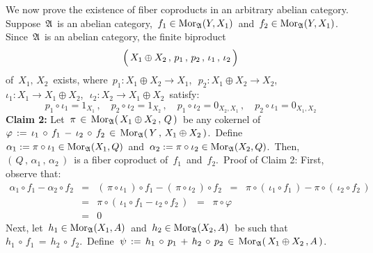 \begin{enumerate}
	We now prove the existence of fiber coproducts in an arbitrary abelian category.
	Suppose \,$\mathfrak{A}$\, is an abelian category,
	\,$f_{1} \in \textnormal{Mor}_{\mathfrak{A}}(Y,X_{1})$\,
	and
	\,$f_{2} \in \textnormal{Mor}_{\mathfrak{A}}(Y,X_{1})$.\,
	Since \,$\mathfrak{A}$\, is an abelian category, the finite {\color{red}biproduct}
	\begin{equation*}
	\left(\,
		X_{1} \overset{{\color{white}.}}{\oplus} X_{2}
		\,,\,
		p_{1}
		\,,\,
		p_{2}
		\,,\,
		\iota_{1}
		\,,\,
		\iota_{2}
		\,\right)
	\end{equation*}
	of \,$X_{1},\, X_{2}$\, exists, where
	\,$p_{1} : X_{1} \oplus X_{2} \longrightarrow X_{1}$,\,
	\,$p_{2} : X_{1} \oplus X_{2} \longrightarrow X_{2}$,\,
	\,$\iota_{1} : X_{1} \longrightarrow X_{1} \oplus X_{2}$,\,
	\,$\iota_{2} : X_{2} \longrightarrow X_{1} \oplus X_{2}$\,
	satisfy:
	\begin{equation*}
	p_{1} \circ \iota_{1} = 1_{X_{1}}\,,
	\quad
	p_{2} \circ \iota_{2} = 1_{X_{2}}\,,
	\quad
	p_{1} \circ \iota_{2} = 0_{X_{2},X_{1}}\,,
	\quad
	p_{2} \circ \iota_{1} = 0_{X_{1},X_{2}}
	\end{equation*}
	\vskip 0.3cm
	\noindent
	\textbf{Claim 2:}\quad
	Let \,$\pi \,\in\, \textnormal{Mor}_{\mathfrak{A}}(\,X_{1}\oplus X_{2}\,,\,Q\,)$\,
	be any {\color{red}cokernel of
	\,$\varphi\,:=\,\iota_{1}\,\circ\,f_{1}\,-\,\iota_{2}\,\circ\,f_{2}\,\in\,\textnormal{Mor}_{\mathfrak{A}}(\,Y\,,\,X_{1} \oplus X_{2}\,)$}.\,
	Define
	\,$\alpha_{1} := \pi \circ \iota_{1} \in \textnormal{Mor}_{\mathfrak{A}}(X_{1},Q)$\,
	and
	\,$\alpha_{2} := \pi \circ \iota_{2} \in \textnormal{Mor}_{\mathfrak{A}}(X_{2},Q)$.\,
	Then,
	\,$\left(\,Q\,,\,\alpha_{1}\,,\,\alpha_{2}\,\right)$\,
	is a fiber coproduct of
	\,$f_{1}$\,
	and
	\,$f_{2}$.\,
	\vskip 0.2cm
	\noindent
	Proof of Claim 2:\;\;
	First, observe that:
	\begin{eqnarray*}
	\alpha_{1} \circ f_{1} - \alpha_{2} \circ f_{2}
	& = &
		(\,\pi \circ \iota_{1}\,) \circ f_{1} - (\,\pi \circ \iota_{2}\,) \circ f_{2}
	\;\; = \;\;
		\pi \circ (\,\iota_{1} \circ f_{1}\,) - \pi \circ (\,\iota_{2} \circ f_{2}\,)
	\\
	& = &
		\pi \circ (\,\iota_{1} \circ f_{1} - \iota_{2} \circ f_{2}\,) 
	\;\; = \;\;
		\pi \circ \varphi
	\\
	& = &
		0
	\end{eqnarray*}
	Next, let
	\,$h_{1} \in \textnormal{Mor}_{\mathfrak{A}}(X_{1},A)$\,
	and
	\,$h_{2} \in \textnormal{Mor}_{\mathfrak{A}}(X_{2},A)$\,
	be such that
	\,$h_{1}\,\circ\,f_{1} \,=\, h_{2}\,\circ\,f_{2}$.\,
	Define
	\,$\psi\,:=\,h_{1}\,\circ\,p_{1}\,+\,h_{2}\,\circ \,p_{2}\,\in\,\textnormal{Mor}_{\mathfrak{A}}(\,X_{1}\oplus X_{2}\,,A\,)$.\,

\end{enumerate}
